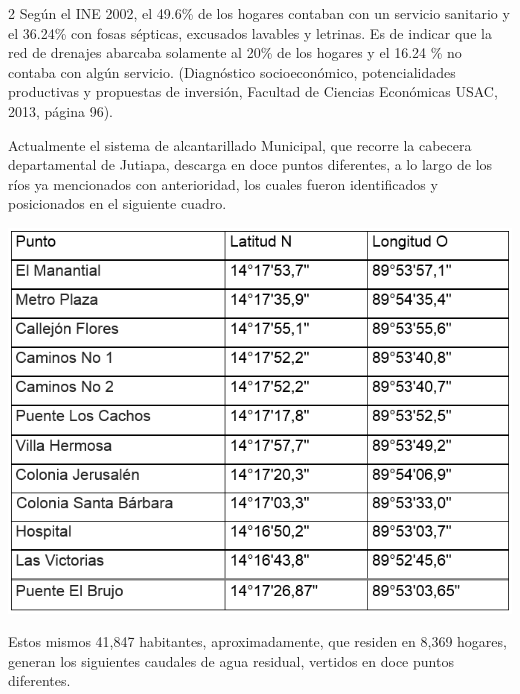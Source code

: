 \documentclass[11pt,spanish,Letterpaper,openany]{book}
\begin{document}
\begin {multicols}{2}
Según el INE 2002, el 49.6\% de los hogares contaban con un servicio sanitario y el 36.24\% con fosas sépticas, excusados lavables y letrinas. Es de indicar que la red de drenajes abarcaba solamente al 20\% de los hogares y el 16.24 \% no contaba con algún servicio. (Diagnóstico socioeconómico, potencialidades productivas y propuestas de inversión, Facultad de Ciencias Económicas USAC, 2013, página 96).

Actualmente el sistema de alcantarillado Municipal, que recorre la cabecera departamental de Jutiapa, descarga en doce puntos diferentes, a lo largo de los ríos ya mencionados con anterioridad, los cuales fueron identificados y posicionados en el siguiente cuadro.

\begin {flushleft}
\noindent\begin{minipage}[c]{\columnwidth}

\includegraphics[width=1\linewidth]{images/201901-gfong-imagen03}

\end{minipage}

\end {flushleft}

Estos mismos 41,847 habitantes, aproximadamente, que residen en 8,369 hogares, generan los siguientes caudales de agua residual, vertidos en doce puntos diferentes.

\begin {flushleft}
\noindent\begin{minipage}[c]{\columnwidth}


\end{minipage}
\end{flushleft}
\end{multicols}
\end{document}
